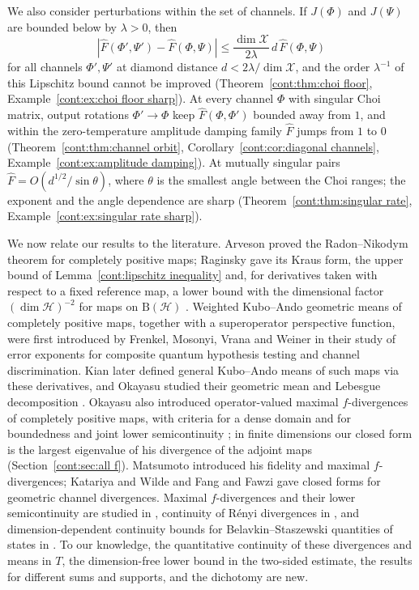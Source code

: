 We also consider perturbations within the set of channels. If $J(\Phi)$ and $J(\Psi)$ are bounded below by $\lambda>0$, then
\[
|\widehat{F}(\Phi',\Psi')-\widehat{F}(\Phi,\Psi)|\leq\frac{\dim\mathcal{X}}{2\lambda}\,d\,\widehat{F}(\Phi,\Psi)
\]
for all channels $\Phi',\Psi'$ at diamond distance $d<2\lambda/\dim\mathcal{X}$, and the order $\lambda^{-1}$ of this Lipschitz bound cannot be improved (Theorem~\ref{cont:thm:choi floor}, Example~\ref{cont:ex:choi floor sharp}). At every channel $\Phi$ with singular Choi matrix, output rotations $\Phi'\to\Phi$ keep $\widehat{F}(\Phi,\Phi')$ bounded away from $1$, and within the zero-temperature amplitude damping family $\widehat{F}$ jumps from $1$ to $0$ (Theorem~\ref{cont:thm:channel orbit}, Corollary~\ref{cont:cor:diagonal channels}, Example~\ref{cont:ex:amplitude damping}). At mutually singular pairs $\widehat{F}=O(d^{1/2}/\sin\theta)$, where $\theta$ is the smallest angle between the Choi ranges; the exponent and the angle dependence are sharp (Theorem~\ref{cont:thm:singular rate}, Example~\ref{cont:ex:singular rate sharp}).

We now relate our results to the literature. Arveson \cite{arveson1969subalgebras} proved the Radon--Nikodym theorem for completely positive maps; Raginsky \cite{Raginsky2003} gave its Kraus form, the upper bound of Lemma~\ref{cont:lipschitz inequality} and, for derivatives taken with respect to a fixed reference map, a lower bound with the dimensional factor $(\dim\mathcal{H})^{-2}$ for maps on $\mathrm{B}(\mathcal{H})$ \cite[eq.~(17)]{Raginsky2003}. Weighted Kubo--Ando geometric means of completely positive maps, together with a superoperator perspective function, were first introduced by Frenkel, Mosonyi, Vrana and Weiner \cite{FMVW2025} in their study of error exponents for composite quantum hypothesis testing and channel discrimination. Kian \cite{kian2026relative} later defined general Kubo--Ando means of such maps via these derivatives, and Okayasu studied their geometric mean and Lebesgue decomposition \cite{Okayasu2026}. Okayasu \cite{Okayasu2026maxf} also introduced operator-valued maximal $f$-divergences of completely positive maps, with criteria for a dense domain and for boundedness \cite[Proposition~4.11]{Okayasu2026maxf} and joint lower semicontinuity \cite[Theorem~4.7]{Okayasu2026maxf}; in finite dimensions our closed form is the largest eigenvalue of his divergence of the adjoint maps (Section~\ref{cont:sec:all f}). Matsumoto \cite{matsumoto2010reverse,Matsumoto2018newf} introduced his fidelity and maximal $f$-divergences; Katariya and Wilde \cite{KatariyaWilde2021} and Fang and Fawzi \cite{FangFawzi2021} gave closed forms for geometric channel divergences. Maximal $f$-divergences and their lower semicontinuity are studied in \cite{HiaiMosonyi2017,Hiai2019maximal}, continuity of R\'enyi divergences in \cite{MosonyiHiai2024}, and dimension-dependent continuity bounds for Belavkin--Staszewski quantities of states in \cite{BluhmCapelGondolfPerezHernandez2023}. To our knowledge, the quantitative continuity of these divergences and means in $T$, the dimension-free lower bound in the two-sided estimate, the results for different sums and supports, and the dichotomy are new.

